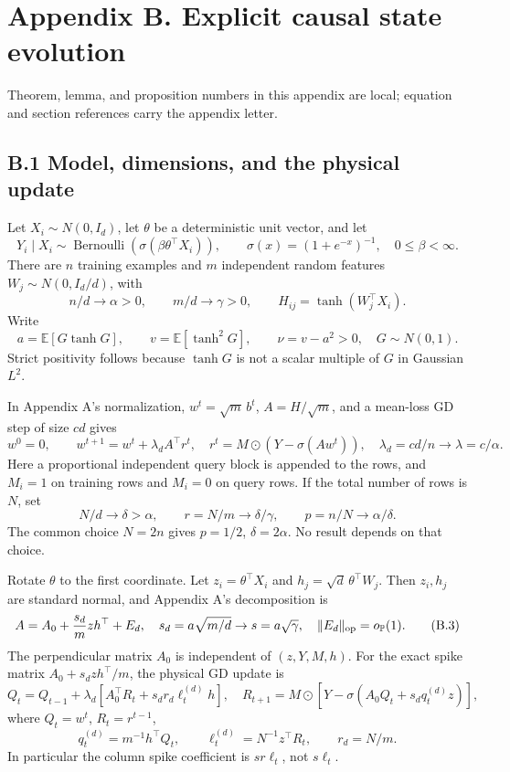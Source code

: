 \documentclass[
  11pt,
  a4paper,
]{article}
\begin{document}
\clearpage

\hypertarget{appendix-b.-explicit-causal-state-evolution}{%
\section{Appendix B. Explicit causal state
evolution}\label{appendix-b.-explicit-causal-state-evolution}}

Theorem, lemma, and proposition numbers in this appendix are local;
equation and section references carry the appendix letter.

\hypertarget{b.1-model-dimensions-and-the-physical-update}{%
\subsection{B.1 Model, dimensions, and the physical
update}\label{b.1-model-dimensions-and-the-physical-update}}

Let \(X_i\sim N(0,I_d)\), let \(\theta\) be a deterministic unit vector,
and let \[
Y_i\mid X_i\sim\operatorname{Bernoulli}(\sigma(\beta\theta^\top X_i)),
\qquad \sigma(x)=(1+e^{-x})^{-1},\quad 0\le\beta<\infty.
\] There are \(n\) training examples and \(m\) independent random
features \(W_j\sim N(0,I_d/d)\), with \[
n/d\to\alpha>0,\qquad m/d\to\gamma>0,\qquad
H_{ij}=\tanh(W_j^\top X_i).
\] Write \[
a=\mathbb E[G\tanh G],\qquad v=\mathbb E[\tanh^2G],\qquad
\nu=v-a^2>0,\quad G\sim N(0,1).
\] Strict positivity follows because \(\tanh G\) is not a scalar
multiple of \(G\) in Gaussian \(L^2\).

In Appendix A's normalization, \(w^t=\sqrt m\,b^t\), \(A=H/\sqrt m\),
and a mean-loss GD step of size \(cd\) gives \[
w^0=0,\qquad w^{t+1}=w^t+\lambda_d A^\top r^t,
\quad r^t=M\odot(Y-\sigma(Aw^t)),\quad \lambda_d=cd/n\to\lambda=c/\alpha.
\tag{B.1}
\] Here a proportional independent query block is appended to the rows,
and \(M_i=1\) on training rows and \(M_i=0\) on query rows. If the total
number of rows is \(N\), set \[
N/d\to\delta>\alpha,\qquad r=N/m\to\delta/\gamma,
\qquad p=n/N\to\alpha/\delta.
\tag{B.2}
\] The common choice \(N=2n\) gives \(p=1/2\), \(\delta=2\alpha\). No
result depends on that choice.

Rotate \(\theta\) to the first coordinate. Let \(z_i=\theta^\top X_i\)
and \(h_j=\sqrt d\,\theta^\top W_j\). Then \(z_i,h_j\) are standard
normal, and Appendix A's decomposition is \[
A=A_0+\frac{s_d}{m}zh^\top+E_d,
\quad s_d=a\sqrt{m/d}\to s=a\sqrt\gamma,
\quad \|E_d\|_{\rm op}=o_{\mathbb P}(1).
\tag{B.3}
\] The perpendicular matrix \(A_0\) is independent of \((z,Y,M,h)\). For
the exact spike matrix \(A_0+s_dzh^\top/m\), the physical GD update is
\[
Q_t=Q_{t-1}+\lambda_d\left[A_0^\top R_t+s_d r_d\ell_t^{(d)}h\right],
\quad R_{t+1}=M\odot\left[Y-\sigma(A_0Q_t+s_dq_t^{(d)}z)\right],
\tag{B.4}
\] where \(Q_t=w^t\), \(R_t=r^{t-1}\), \[
q_t^{(d)}=m^{-1}h^\top Q_t,\qquad
\ell_t^{(d)}=N^{-1}z^\top R_t,\qquad r_d=N/m.
\] In particular the column spike coefficient is \(s r\ell_t\), not
\(s\ell_t\).
\end{document}
